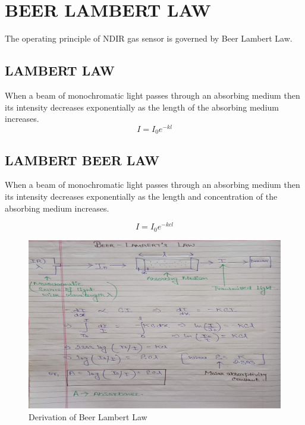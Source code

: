 \documentclass[12pt]{article}
\begin{document}
\section{BEER LAMBERT LAW}

The operating principle of NDIR gas sensor is governed by Beer Lambert Law.

\subsection{LAMBERT LAW}
When a beam of  monochromatic light passes through an absorbing medium then its intensity decreases exponentially as the length of the absorbing medium increases.
$$I=I_{0}e^{-kl}$$ 

\subsection{LAMBERT BEER LAW}
When a beam of  monochromatic light passes through an absorbing medium then its intensity decreases exponentially as the length and concentration of the absorbing medium increases.

$$I=I_{0}e^{-kcl}$$ 

\begin{figure}[h]
\centering
\includegraphics[scale=0.7]{Beer.png}
\caption{Derivation of Beer Lambert Law}
\end{figure}
\end{document}
